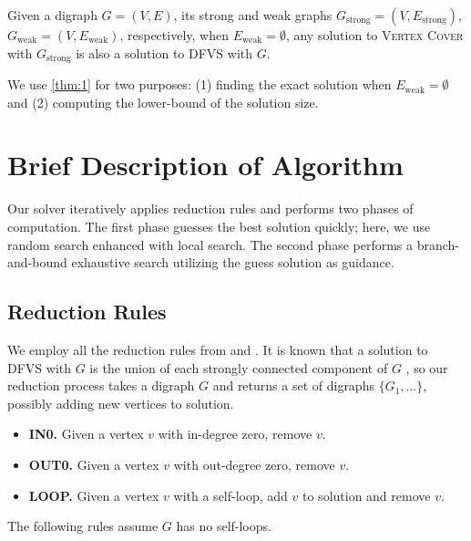 \documentclass[a4paper,UKenglish,cleveref, autoref, thm-restate]{lipics-v2021}
\begin{document}
\begin{proposition}\label{thm:1}
    Given a digraph $G=(V,E)$, its strong and weak graphs $G_\text{strong}=(V,E_\text{strong})$,
    $G_\text{weak}=(V,E_\text{weak})$, respectively,
    when $E_\text{weak}=\emptyset$, any solution to \textnormal{\textsc{Vertex Cover}} with $G_\text{strong}$
    is also a solution to \textnormal{\textsc{DFVS}} with $G$.
\end{proposition}

We use \cref{thm:1} for two purposes: (1) finding the exact solution when $E_\text{weak}=\emptyset$ and
 (2) computing the lower-bound of the solution size.


\section{Brief Description of Algorithm}

Our solver iteratively applies reduction rules and performs two phases of computation.
The first phase guesses the best solution quickly;
 here, we use random search enhanced with local search.
The second phase performs a branch-and-bound exhaustive search utilizing the guess solution as guidance.

\subsection{Reduction Rules}

We employ all the reduction rules from \cite{levy_contraction_1988} and \cite{hen-ming_lin_computing_2000}.
It is known that a solution to \textsc{DFVS} with $G$ is the union of each strongly connected component of
 $G$ \cite{hen-ming_lin_computing_2000},
 so our reduction process takes a digraph $G$ and returns a set of digraphs $\{G_1,\ldots\}$,
 possibly adding new vertices to solution.

\begin{itemize}
    \item \textbf{IN0.} Given a vertex $v$ with in-degree zero, remove $v$.
    \item \textbf{OUT0.} Given a vertex $v$ with out-degree zero, remove $v$.
    \item \textbf{LOOP.} Given a vertex $v$ with a self-loop, add $v$ to solution and remove $v$.
\end{itemize}

The following rules assume $G$ has no self-loops.
\end{document}
